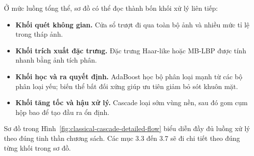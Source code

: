Ở mức luồng tổng thể, sơ đồ có thể đọc thành bốn khối xử lý liên tiếp:
\begin{itemize}
  \item \textbf{Khối quét không gian.} Cửa sổ trượt đi qua toàn bộ ảnh và nhiều mức tỉ lệ trong tháp ảnh.
  \item \textbf{Khối trích xuất đặc trưng.} Đặc trưng Haar-like hoặc MB-LBP được tính nhanh bằng ảnh tích phân.
  \item \textbf{Khối học và ra quyết định.} AdaBoost học bộ phân loại mạnh từ các bộ phân loại yếu; biến thể bất đối xứng giúp ưu tiên giảm bỏ sót khuôn mặt.
  \item \textbf{Khối tăng tốc và hậu xử lý.} Cascade loại sớm vùng nền, sau đó gom cụm hộp bao để tạo đầu ra ổn định.
\end{itemize}

Sơ đồ trong Hình~\ref{fig:classical-cascade-detailed-flow} biểu diễn đầy đủ luồng xử lý theo đúng tinh thần chương sách.
Các mục 3.3 đến 3.7 sẽ đi chi tiết theo đúng từng khối trong sơ đồ.

